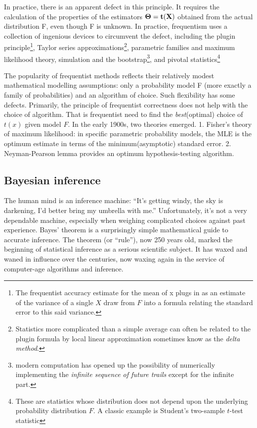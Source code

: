 \documentclass{article}
\begin{document}
In practice, there is an apparent defect in this principle. It requires
the calculation of the properties of the estimators \(\bf{\Theta}=t(X)\)
obtained from the actual distribution F, even though F is unknown. In
practice, frequentism uses a collection of ingenious devices to
circumvent the defect, including the plugin principle\footnote{The
  frequentist accuracy estimate for the mean of x plugs in as an
  estimate of the variance of a single \(X\) draw from \(F\) into a
  formula relating the standard error to this said variance.}, Taylor
series approximations\footnote{Statistics more complicated than a simple
  average can often be related to the plugin formula by local linear
  approximation sometimes know as the \emph{delta method}.}, parametric
families and maximum likelihood theory, simulation and the
bootstrap\footnote{modern computation has opened up the possibility of
  numerically implementing the \emph{infinite sequence of future trails}
  except for the infinite part.}, and pivotal statistics\footnote{These
  are statistics whose distribution does not depend upon the underlying
  probability distribution \(F\). A classic example is Student's
  two-sample \(t\)-test statistic}

The popularity of frequentist methods reflects their relatively modest
mathematical modelling assumptions: only a probability model F (more
exactly a family of probabilities) and an algorithm of choice. Such
flexibility has some defects. Primarily, the principle of frequentist
correctness does not help with the choice of algorithm. That is
frequentist need to find the \emph{best}(optimal) choice of \(t(x)\)
given model \(F\). In the early 1900s, two theories emerged. 1. Fisher's
theory of maximum likelihood: in specific parametric probability models,
the MLE is the optimum estimate in terms of the minimum(asymptotic)
standard error. 2. Neyman-Pearson lemma provides an optimum
hypothesis-testing algorithm.

\hypertarget{bayesian-inference}{%
\subsection{Bayesian inference}\label{bayesian-inference}}

The human mind is an inference machine: ``It's getting windy, the sky is
darkening, I'd better bring my umbrella with me.'' Unfortunately, it's
not a very dependable machine, especially when weighing complicated
choices against past experience. Bayes' theorem is a surprisingly simple
mathematical guide to accurate inference. The theorem (or ``rule''), now
250 years old, marked the beginning of statistical inference as a
serious scientific subject. It has waxed and waned in influence over the
centuries, now waxing again in the service of computer-age algorithms
and inference.
\end{document}
